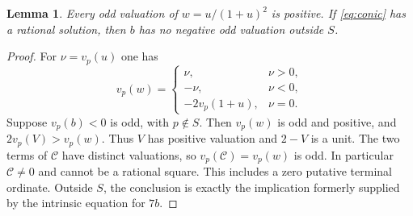 \documentclass[11pt,a4paper]{article}
\newtheorem{lemma}[theorem]{Lemma}
\begin{document}
\begin{lemma}\label{lem:normalized}
Every odd valuation of $w=u/(1+u)^2$ is positive. If
\eqref{eq:conic} has a rational solution, then $b$ has no negative
odd valuation outside $S$.
\end{lemma}
\begin{proof}
For $\nu=v_p(u)$ one has
\[
 v_p(w)=
 \begin{cases}
 \nu,&\nu>0,\\
 -\nu,&\nu<0,\\
 -2v_p(1+u),&\nu=0.
 \end{cases}
\]
Suppose $v_p(b)<0$ is odd, with $p\notin S$.
Then $v_p(w)$ is odd and positive, and
$2v_p(V)>v_p(w)$. Thus $V$ has positive valuation and $2-V$
is a unit. The two terms of $\mathcal C$ have distinct valuations,
so $v_p(\mathcal C)=v_p(w)$ is odd. In particular
$\mathcal C\ne0$ and cannot be a rational square. This includes
a zero putative terminal ordinate. Outside $S$, the conclusion is
exactly the implication formerly supplied by the intrinsic equation
for $7b$.
\end{proof}
\end{document}
